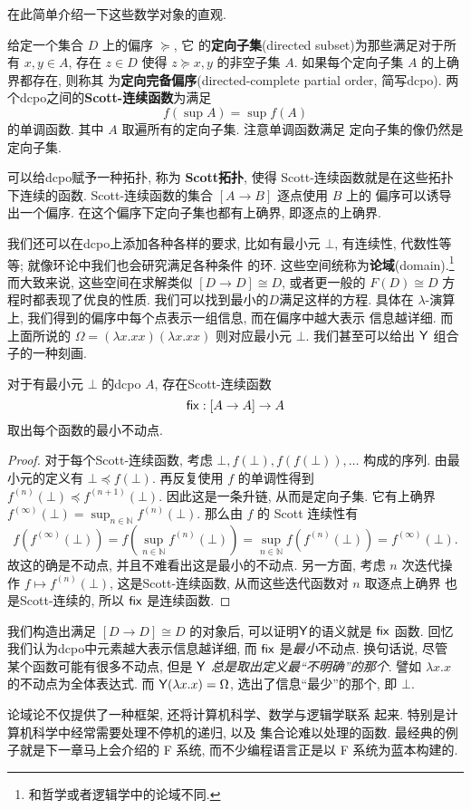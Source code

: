 在此简单介绍一下这些数学对象的直观.
\begin{definition}
给定一个集合 \(D\) 上的偏序 \(\succeq\), 它
的\textbf{定向子集}(directed subset)为那些满足对于所有 \(x,y\in A\),
存在 \(z \in D\) 使得 \(z \succeq x, y\) 的非空子集
\(A\). 如果每个定向子集 \(A\) 的上确界都存在, 则称其
为\textbf{定向完备偏序}(directed-complete partial order, 简写dcpo).
两个dcpo之间的\textbf{Scott-连续函数}为满足
\[f\left(\sup A\right) = \sup f(A)\]
的单调函数. 其中 \(A\) 取遍所有的定向子集. 注意单调函数满足
定向子集的像仍然是定向子集.
\end{definition}
可以给dcpo赋予一种拓扑, 称为 \textbf{Scott拓扑},
使得 Scott-连续函数就是在这些拓扑下连续的函数.
Scott-连续函数的集合 \([A \to B]\) 逐点使用 \(B\) 上的
偏序可以诱导出一个偏序. 在这个偏序下定向子集也都有上确界,
即逐点的上确界.

我们还可以在dcpo上添加各种各样的要求, 比如有最小元 \(\bot\),
有连续性, 代数性等等; 就像环论中我们也会研究满足各种条件
的环. 这些空间统称为\textbf{论域}(domain).\footnote{和哲学或者逻辑学中的论域不同.}
而大致来说, 这些空间在求解类似 \([D \to D] \cong D\),
或者更一般的 \(F(D) \cong D\) 方程时都表现了优良的性质.
我们可以找到最小的\(D\)满足这样的方程. 具体在 \(\lambda\)-演算
上, 我们得到的偏序中每个点表示一组信息, 而在偏序中越大表示
信息越详细. 而上面所说的 \(\Omega = (\lambda x. xx) (\lambda x.xx)\)
则对应最小元 \(\bot\). 我们甚至可以给出 \(\cons{Y}\)
组合子的一种刻画.
\begin{lemma}
对于有最小元 \(\bot\) 的dcpo \(A\),
存在Scott-连续函数
\[\cons{fix} : [A \to A] \to A\]
取出每个函数的最小不动点.
\end{lemma}
\begin{proof}
对于每个Scott-连续函数,
考虑 \(\bot, f(\bot), f(f(\bot)),\dots\) 构成的序列.
由最小元的定义有 \(\bot \preceq f(\bot)\). 再反复使用
\(f\) 的单调性得到 \(f^{(n)}(\bot) \preceq f^{(n+1)}(\bot)\).
因此这是一条升链, 从而是定向子集. 它有上确界
\(f^{(\infty)}(\bot) = \sup_{n\in\mathbb N}f^{(n)}(\bot).\)
那么由 \(f\) 的 Scott 连续性有
\[f(f^{(\infty)}(\bot)) = f(\sup_{n\in\mathbb N}f^{(n)}(\bot))
= \sup_{n\in\mathbb N} f(f^{(n)}(\bot)) = f^{(\infty)}(\bot).\]
故这的确是不动点, 并且不难看出这是最小的不动点.
另一方面, 考虑 \(n\) 次迭代操作 \(f \mapsto f^{(n)}(\bot)\),
这是Scott-连续函数, 从而这些迭代函数对 \(n\) 取逐点上确界
也是Scott-连续的, 所以 \(\cons{fix}\) 是连续函数.
\end{proof}

我们构造出满足 \([D \to D] \cong D\) 的对象后,
可以证明\(\cons{Y}\)的语义就是 \(\cons{fix}\) 函数.
回忆我们认为dcpo中元素越大表示信息越详细,
而 \(\cons{fix}\) 是\emph{最小}不动点. 换句话说, 尽管
某个函数可能有很多不动点, 但是 \(\cons{Y}\)
\emph{总是取出定义最“不明确”的那个}. 譬如 \(\lambda x.x\)
的不动点为全体表达式. 而 \(\cons{Y}(\lambda x. x) = \Omega\),
选出了信息“最少”的那个, 即 \(\bot\).

论域论不仅提供了一种框架, 还将计算机科学、数学与逻辑学联系
起来. 特别是计算机科学中经常需要处理不停机的递归, 以及
集合论难以处理的函数. 最经典的例子就是下一章马上会介绍的
F 系统, 而不少编程语言正是以 F 系统为蓝本构建的.
